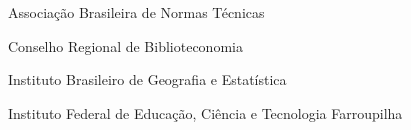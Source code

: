 \begin{siglas}
  \item[ABNT] Associação Brasileira de Normas Técnicas
  \item[CRB] Conselho Regional de Biblioteconomia
  \item[IBGE] Instituto Brasileiro de Geografia e Estatística
  \item[IFFar] Instituto Federal de Educação, Ciência e Tecnologia Farroupilha
\end{siglas}